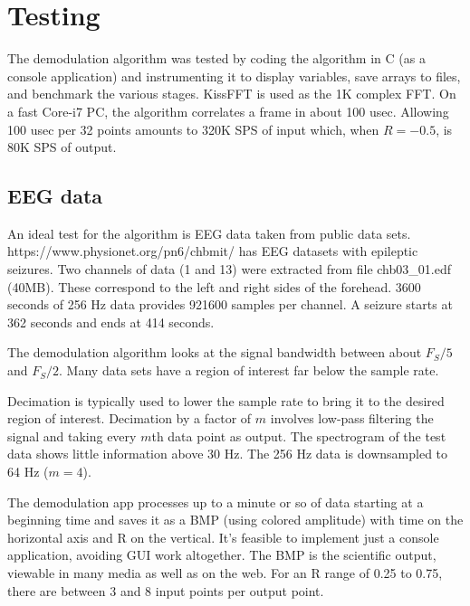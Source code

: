 \section{Testing}

The demodulation algorithm was tested by coding the algorithm in C (as a console
application) and instrumenting it to display variables,
save arrays to files, and benchmark the various stages.
KissFFT is used as the 1K complex FFT.
On a fast Core-i7 PC, the algorithm correlates a frame in about 100 usec.
Allowing 100 usec per 32 points amounts to 320K SPS of input which, when $R=-0.5$,
is 80K SPS of output.

\subsection{EEG data}

An ideal test for the algorithm is EEG data taken from public data sets.
https://www.physionet.org/pn6/chbmit/ has EEG datasets with epileptic seizures.
Two channels of data (1 and 13) were extracted from file chb03_01.edf (40MB).
These correspond to the left and right sides of the forehead.
3600 seconds of 256 Hz data provides 921600 samples per channel.
A seizure starts at 362 seconds and ends at 414 seconds.

The demodulation algorithm looks at the signal bandwidth between about
$F_S/5$ and $F_S/2$.
Many data sets have a region of interest far below the sample rate.

Decimation is typically used to lower the sample rate to bring it to the
desired region of interest. 
Decimation by a factor of $m$ involves low-pass filtering the signal
and taking every $m$th data point as output.
The spectrogram of the test data shows little information above 30 Hz.
The 256 Hz data is downsampled to 64 Hz ($m=4$).

The demodulation app processes up to a minute or so of data starting at a 
beginning time and saves it as a BMP (using colored amplitude) with time on the
horizontal axis and R on the vertical.
It's feasible to implement just a console application,
avoiding GUI work altogether.
The BMP is the scientific output, viewable in many media as well as on the web.
For an R range of 0.25 to 0.75, there are between 3 and 8 input points per 
output point. 

